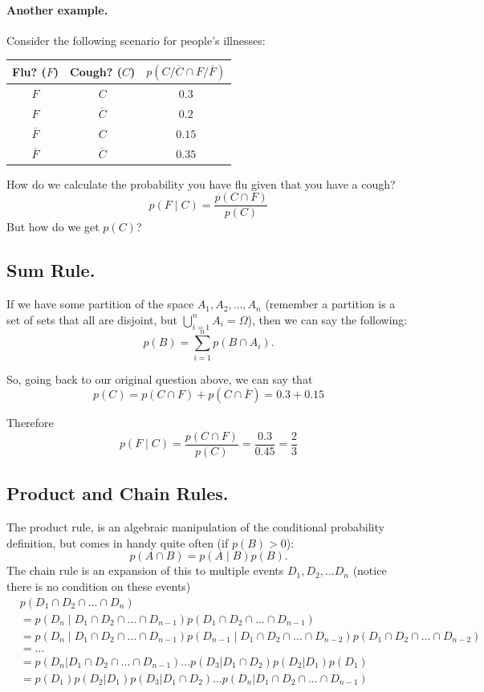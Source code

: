 \paragraph{Another example.}
Consider the following scenario for people's illnesses:
\begin{center}
\begin{tabular}{c|c|c}
\textbf{Flu? ($F$)} & \textbf{Cough? ($C$)} & \textbf{$p(C/\overline{C} \cap F/\overline{F})$}\\
\hline
$F$ & $C$ & $0.3$\\
$F$ & $\overline{C}$ & $0.2$\\
$\overline{F}$ & $C$ & $0.15$\\
$\overline{F}$ & $\overline{C}$ & $0.35$\\
\end{tabular}
\end{center}

How do we calculate the probability you have flu given that you have a cough? 
\[p(F \mid C) = \frac{p(C \cap F)}{p(C)}\]
But how do we get $p(C)$?

\subsection{Sum Rule.}
If we have some partition of the space $A_1, A_2,..., A_n$
(remember a partition is a set of sets that all are disjoint, but $\bigcup_{i=1}^nA_i=\Omega$), 
then we can say the following: 
\[p(B) = \sum_{i=1}^n p(B\cap A_i).\]

So, going back to our original question above, 
we can say that 
\[p(C) = p(C \cap F) + p(C \cap \overline{F}) = 0.3 + 0.15\]

Therefore 
\[p(F \mid C) = \frac{p(C \cap F)}{p(C)} = \frac{0.3}{0.45} = \frac{2}{3}\]

\subsection{Product and Chain Rules.}
The product rule, is an algebraic manipulation of the conditional probability definition, but comes in handy quite often (if $p(B)>0$):
\[p(A\cap B) = p(A\mid B)p(B).\]
The chain rule is an expansion of this to multiple events $D_1,D_2,...D_n$ (notice there is no condition on these events)
\begin{align*}
&p(D_1 \cap D_2 \cap ... \cap D_n)\\
&= p(D_n \mid D_1 \cap D_2 \cap ... \cap D_{n-1})p(D_1 \cap D_2 \cap ... \cap D_{n-1})\\
& = p(D_n \mid D_1 \cap D_2 \cap ... \cap D_{n-1}) p(D_{n-1} \mid D_1 \cap D_2 \cap ... \cap D_{n-2})p(D_1 \cap D_2 \cap ... \cap D_{n-2})\\
& = ...\\
& = p(D_n| D_1 \cap D_2 \cap ... \cap D_{n-1})...p(D_3|D_1\cap D_2)p(D_2 | D_1)p(D_1)\\
& = p(D_1)p(D_2 | D_1)p(D_3|D_1\cap D_2)...p(D_n| D_1 \cap D_2 \cap ... \cap D_{n-1})
\end{align*}

